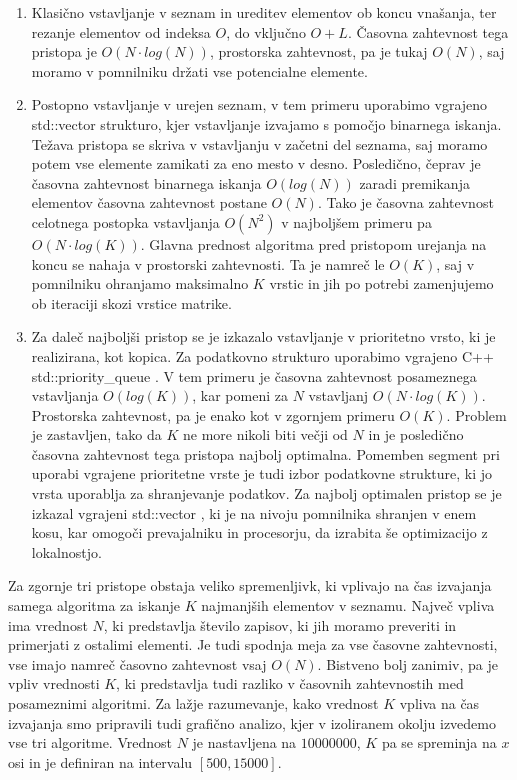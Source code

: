 \documentclass[a4paper,12pt,openright]{book}
\begin{document}
        \begin{enumerate}
            \item Klasično vstavljanje v seznam in ureditev elementov ob koncu vnašanja, ter rezanje elementov od indeksa $O$, do vključno $O+L$. Časovna zahtevnost tega pristopa je $O(N \cdot log(N))$, prostorska zahtevnost, pa je tukaj $O(N)$, saj moramo v pomnilniku držati vse potencialne elemente.
            \item Postopno vstavljanje v urejen seznam, v tem primeru uporabimo vgrajeno std::vector \cite{CPP_VECTOR} strukturo, kjer vstavljanje izvajamo s pomočjo binarnega iskanja. Težava pristopa se skriva v vstavljanju v začetni del seznama, saj moramo potem vse elemente zamikati za eno mesto v desno. Posledično, čeprav je časovna zahtevnost binarnega iskanja $O(log(N))$ zaradi premikanja elementov časovna zahtevnost postane $O(N)$. Tako je časovna zahtevnost celotnega postopka vstavljanja $O(N^2)$ v najboljšem primeru pa $O(N \cdot log(K))$. Glavna prednost algoritma pred pristopom urejanja na koncu se nahaja v prostorski zahtevnosti. Ta je namreč le $O(K)$, saj v pomnilniku ohranjamo maksimalno $K$ vrstic in jih po potrebi zamenjujemo ob iteraciji skozi vrstice matrike.
            \item Za daleč najboljši pristop se je izkazalo vstavljanje v prioritetno vrsto, ki je realizirana, kot kopica. Za podatkovno strukturo uporabimo vgrajeno C++ std::priority\_queue \cite{CPP_PQUEUE}. V tem primeru je časovna zahtevnost posameznega vstavljanja $O(log(K))$, kar pomeni za $N$ vstavljanj $O(N \cdot log(K))$. Prostorska zahtevnost, pa je enako kot v zgornjem primeru $O(K)$. Problem je zastavljen, tako da $K$ ne more nikoli biti večji od $N$ in je posledično časovna zahtevnost tega pristopa najbolj optimalna. Pomemben segment pri uporabi vgrajene prioritetne vrste je tudi izbor podatkovne strukture, ki jo vrsta uporablja za shranjevanje podatkov. Za najbolj optimalen pristop se je izkazal vgrajeni std::vector \cite{CPP_VECTOR}, ki je na nivoju pomnilnika shranjen v enem kosu, kar omogoči prevajalniku in procesorju, da izrabita še optimizacijo z lokalnostjo.
        \end{enumerate}

        \noindent
        Za zgornje tri pristope obstaja veliko spremenljivk, ki vplivajo na čas izvajanja samega algoritma za iskanje $K$ najmanjših elementov v seznamu. Največ vpliva ima vrednost $N$, ki predstavlja število zapisov, ki jih moramo preveriti in primerjati z ostalimi elementi. Je tudi spodnja meja za vse časovne zahtevnosti, vse imajo namreč časovno zahtevnost vsaj $O(N)$. Bistveno bolj zanimiv, pa je vpliv vrednosti $K$, ki predstavlja tudi razliko v časovnih zahtevnostih med posameznimi algoritmi. Za lažje razumevanje, kako vrednost $K$ vpliva na čas izvajanja smo pripravili tudi grafično analizo, kjer v izoliranem okolju izvedemo vse tri algoritme. Vrednost $N$ je nastavljena na $\num{10000000}$, $K$ pa se spreminja na $x$ osi in je definiran na intervalu $[500, 15000]$.
\end{document}
